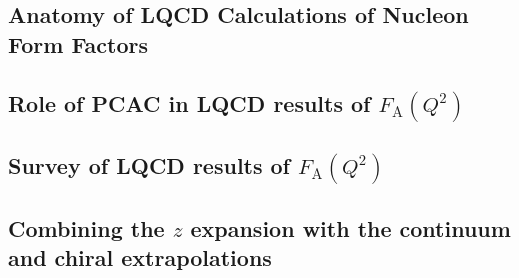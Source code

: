 



%

\subsection{Anatomy of LQCD Calculations of Nucleon Form Factors\label{sec:calc_anatomy}}


\subsection{Role of PCAC in LQCD results of $F_{\mathrm{A}}(Q^2)$\label{sec:lqcd_pcac}}


\subsection{Survey of LQCD results of $F_{\mathrm{A}}(Q^2)$\label{sec:lqcd_results}}


\subsection{Combining the $z$ expansion with the continuum and chiral extrapolations\label{sec:z_continuum}}

